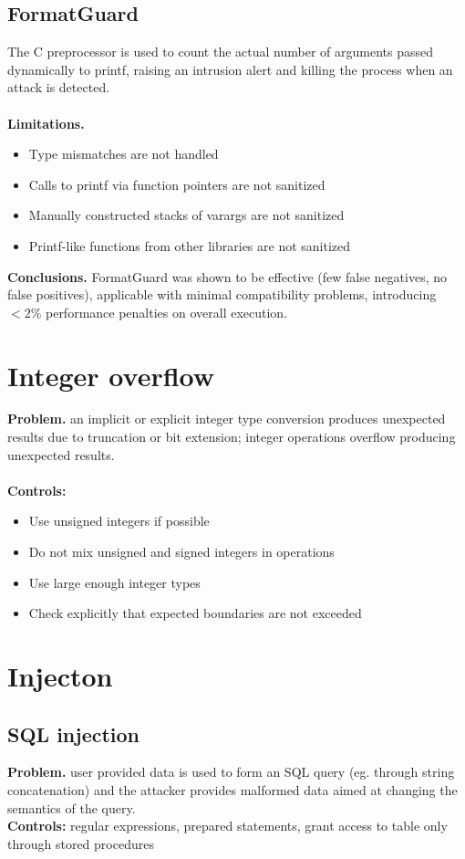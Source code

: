 \documentclass[10pt,a4paper]{article}
\begin{document}
\subsection{FormatGuard}
The C preprocessor is used to count the actual number of arguments passed dynamically to printf, raising an intrusion alert and killing the process when an attack is detected.\\\\
\textbf{Limitations.} 
\begin{itemize}
\item Type mismatches are not handled
\item Calls to printf via function pointers are not sanitized
\item Manually constructed stacks of varargs are not sanitized
\item Printf-like functions from other libraries are not sanitized
\end{itemize}
\textbf{Conclusions.} FormatGuard was shown to be effective (few false negatives, no false positives), applicable with minimal compatibility problems, introducing $<2\%$ performance penalties on overall execution.

\section{Integer overflow}
\textbf{Problem.} an implicit or explicit integer type conversion produces unexpected results due to truncation or bit extension; integer operations overflow producing unexpected results.\\\\
\textbf{Controls:}
\begin{itemize}
\item Use unsigned integers if possible
\item Do not mix unsigned and signed integers in operations
\item Use large enough integer types
\item Check explicitly that expected boundaries are not exceeded
\end{itemize}
\newpage
\section{Injecton}
\subsection{SQL injection}
\textbf{Problem.} user provided data is used to form an SQL query (eg. through string concatenation) and the attacker provides malformed data aimed at changing the semantics of the query.\\
\textbf{Controls:} regular expressions, prepared statements, grant access to table only through stored procedures
\end{document}
